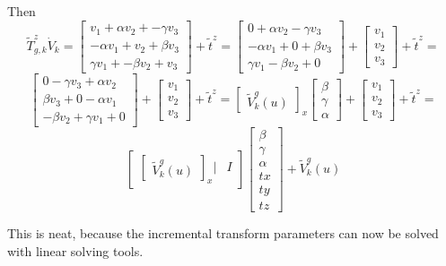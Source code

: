 \documentclass[12pt]{article}
\begin{document}
Then
\begin{equation}
\tilde{T}_{g,k}^{z} \dot{V}_{k}=
\begin{bmatrix}
         v_{1} +   \alpha v_{2} + - \gamma v_{3} \\
- \alpha v_{1} +          v_{2} +   \beta  v_{3}\\
  \gamma v_{1} + - \beta  v_{2} +          v_{3}
\end{bmatrix}
+ 
\tilde{t}^{z}  =
\begin{bmatrix}
            0  +   \alpha v_{2} -   \gamma v_{3} \\
- \alpha v_{1} +             0  +   \beta  v_{3} \\
  \gamma v_{1} -   \beta  v_{2} +             0
\end{bmatrix}
+ 
\begin{bmatrix} v_{1} \\ v_{2} \\ v_{3} \end{bmatrix} +
\tilde{t}^{z}  =
\end{equation}
\begin{equation}
\begin{bmatrix}
            0  - \gamma v_{3} + \alpha v_{2}  \\
  \beta  v_{3} +           0  - \alpha v_{1}  \\
- \beta  v_{2} + \gamma v_{1} +           0
\end{bmatrix}
+ 
\begin{bmatrix} v_{1} \\ v_{2} \\ v_{3} \end{bmatrix} +
\tilde{t}^{z}
=
\begin{bmatrix} \tilde{V}_{k}^{g}(u) \end{bmatrix}_{x} \begin{bmatrix} \beta \\ \gamma \\ \alpha \end{bmatrix}
+ 
\begin{bmatrix} v_{1} \\ v_{2} \\ v_{3} \end{bmatrix} +
\tilde{t}^{z}  =
\end{equation}
\begin{equation}
\left[
\begin{array}{cc}
\begin{bmatrix} \tilde{V}_{k}^{g}(u) \end{bmatrix}_{x} | & I 
\end{array}
\right]
\begin{bmatrix} \beta \\ \gamma \\ \alpha \\ tx \\ ty \\ tz \end{bmatrix} +
\tilde{V}_{k}^{g}(u)
\end{equation}

This is neat, because the incremental transform parameters can now be solved with linear solving tools.
\end{document}
